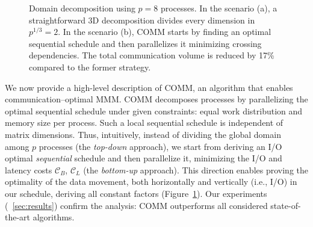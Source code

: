 \documentclass[sigplan,review,anonymous,10pt]{acmart}\settopmatter{printfolios=true,printccs=false,printacmref=false}
\begin{document}
\begin{figure}[!tbp]
	\centering
	\hfill
	\vspace{-1em}
	\caption{Domain decomposition
		using $p=8$  processes. In the scenario (a), a straightforward 3D 
		decomposition
		divides every dimension in $p^{1/3}=2$. In the scenario (b), COMM 
		starts by
		finding an optimal sequential schedule and then parallelizes it 
		minimizing
		crossing dependencies. The total communication volume is reduced by 17\%
		compared to the former strategy.}
	\label{fig:topdown-vs-bottomup}
\end{figure}

We now provide a high-level description of COMM, an algorithm that enables 
communication--optimal MMM.
COMM  decomposes processes by parallelizing the optimal sequential schedule
under given constraints: equal work distribution and memory size per process.
Such a local sequential schedule is independent of matrix dimensions.  Thus,
intuitively, instead of dividing  the global domain among $p$ processes (the
\emph{top-down} approach), we start from deriving an I/O optimal
\emph{sequential} schedule and then parallelize it, minimizing the I/O and
latency costs $\mathcal{C}_B$, $\mathcal{C}_L$ (the \emph{bottom-up} approach).
This direction enables proving the optimality of the data movement, both
horizontally and vertically (i.e., I/O) in our schedule, deriving all constant
factors (Figure~\ref{fig:topdown-vs-bottomup}). Our experiments 
(~\cref{sec:results}) confirm the analysis: COMM outperforms
all considered state-of-the-art algorithms.
\end{document}
